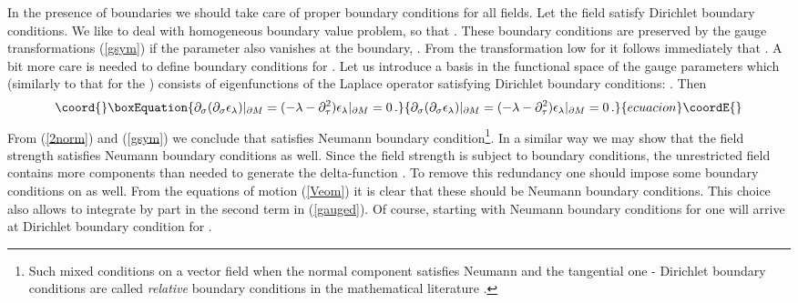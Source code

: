 \documentclass[a4paper,12pt,twoside]{article}
\begin{document}
In the presence of boundaries we should take care of proper
boundary conditions for all fields. Let the field \coordHE{}
satisfy Dirichlet boundary conditions. We like to deal with
homogeneous boundary value problem, so that \coordHE{}.
These boundary conditions are preserved by the gauge transformations
(\ref{gsym}) if the parameter \myHighlight{$\varepsilon$}\coordHE{} also vanishes at the
boundary, \coordHE{}. From the transformation
low for \coordHE{} it follows immediately that \coordHE{}.
A bit more care is needed to define boundary conditions for \coordHE{}.
Let us introduce a basis in the functional space of the gauge
parameters \myHighlight{$\epsilon$}\coordHE{} which (similarly to that for the \coordHE{}) consists
of eigenfunctions of the Laplace operator satisfying Dirichlet
boundary conditions: \myHighlight{$\Delta \epsilon_\lambda =\lambda \epsilon_\lambda$}\coordHE{}.
Then
\begin{equation}\coord{}\boxEquation{
\partial_\sigma (\partial_\sigma \epsilon_\lambda )\vert_{\partial M}=
(-\lambda -\partial_\tau^2 ) \epsilon_\lambda \vert_{\partial M}=0\,.
\label{2norm}
}{
\partial_\sigma (\partial_\sigma \epsilon_\lambda )\vert_{\partial M}=
(-\lambda -\partial_\tau^2 ) \epsilon_\lambda \vert_{\partial M}=0\,.
}{ecuacion}\coordE{}\end{equation} 
{}From (\ref{2norm}) and (\ref{gsym}) we conclude that \coordHE{}
satisfies Neumann boundary condition\footnote{Such mixed 
conditions on a vector field when the normal component
satisfies Neumann and the tangential one - Dirichlet boundary
conditions are called {\it relative} boundary conditions in the mathematical
literature \cite{Gilkey}.}. In a similar way we may show that
the field strength \coordHE{} satisfies 
Neumann boundary conditions as well. Since the field strength
is subject to boundary conditions, the unrestricted field \coordHE{}
contains more components than needed
 to generate the 
delta-function \coordHE{}. 
To remove this redundancy one should impose some boundary conditions
on \coordHE{} as well. From the equations of motion (\ref{Veom})
it is clear that these should be Neumann boundary conditions.
This choice also
allows to integrate by part in the second term in (\ref{gauged}).
Of course, starting with Neumann boundary conditions for
\coordHE{} one will arrive at Dirichlet boundary condition
for \coordHE{}. 
\end{document}
